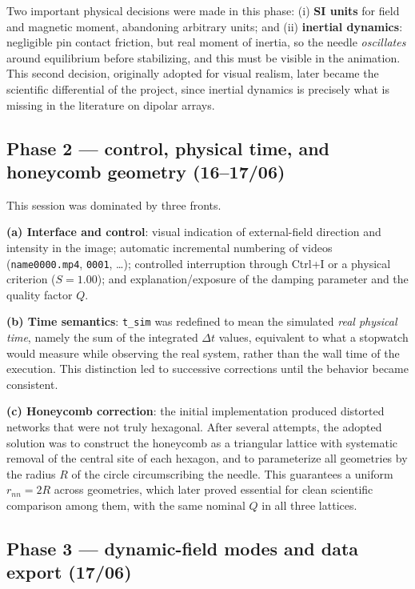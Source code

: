 \documentclass[11pt,a4paper]{article}
\newcommand{\code}[1]{\texttt{#1}}
\begin{document}
Two important physical decisions were made in this phase: (i) \textbf{SI units} for field and magnetic moment, abandoning arbitrary units; and (ii) \textbf{inertial dynamics}: negligible pin contact friction, but real moment of inertia, so the needle \emph{oscillates} around equilibrium before stabilizing, and this must be visible in the animation. This second decision, originally adopted for visual realism, later became the scientific differential of the project, since inertial dynamics is precisely what is missing in the literature on dipolar arrays.

\subsection{Phase 2 --- control, physical time, and honeycomb geometry (16--17/06)}

This session was dominated by three fronts.

\textbf{(a) Interface and control}: visual indication of external-field direction and intensity in the image; automatic incremental numbering of videos (\code{name0000.mp4}, \code{0001}, \dots); controlled interruption through \mbox{Ctrl+I} or a physical criterion ($S = 1.00$); and explanation/exposure of the damping parameter and the quality factor $Q$.

\textbf{(b) Time semantics}: \code{t\_sim} was redefined to mean the simulated \emph{real physical time}, namely the sum of the integrated $\Delta t$ values, equivalent to what a stopwatch would measure while observing the real system, rather than the wall time of the execution. This distinction led to successive corrections until the behavior became consistent.

\textbf{(c) Honeycomb correction}: the initial implementation produced distorted networks that were not truly hexagonal. After several attempts, the adopted solution was to construct the honeycomb as a triangular lattice with systematic removal of the central site of each hexagon, and to parameterize all geometries by the radius $R$ of the circle circumscribing the needle. This guarantees a uniform $r_{nn} = 2R$ across geometries, which later proved essential for clean scientific comparison among them, with the same nominal $Q$ in all three lattices.

\subsection{Phase 3 --- dynamic-field modes and data export (17/06)}
\end{document}

